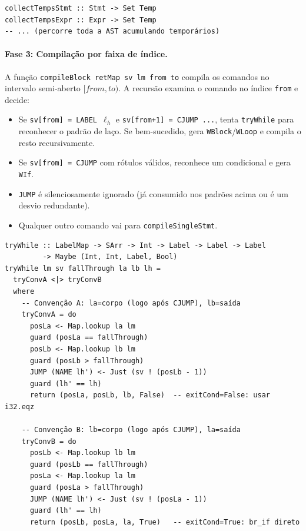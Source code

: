 \begin{verbatim}
collectTempsStmt :: Stmt -> Set Temp
collectTempsExpr :: Expr -> Set Temp
-- ... (percorre toda a AST acumulando temporários)
\end{verbatim}

\paragraph{Fase 3: Compilação por faixa de índice.}
A função \texttt{compileBlock retMap sv lm from to} compila os comandos no
intervalo semi-aberto $[\mathit{from}, \mathit{to})$.  A recursão examina o
comando no índice \texttt{from} e decide:

\begin{itemize}
  \item Se \texttt{sv[from] = LABEL $\ell_h$} e \texttt{sv[from+1] = CJUMP
    ...}, tenta \texttt{tryWhile} para reconhecer o padrão de laço.  Se
    bem-sucedido, gera \texttt{WBlock}/\texttt{WLoop} e compila o resto
    recursivamente.
  \item Se \texttt{sv[from] = CJUMP} com rótulos válidos, reconhece um
    condicional e gera \texttt{WIf}.
  \item \texttt{JUMP} é silenciosamente ignorado (já consumido nos padrões
    acima ou é um desvio redundante).
  \item Qualquer outro comando vai para \texttt{compileSingleStmt}.
\end{itemize}

\begin{verbatim}
tryWhile :: LabelMap -> SArr -> Int -> Label -> Label -> Label
         -> Maybe (Int, Int, Label, Bool)
tryWhile lm sv fallThrough la lb lh =
  tryConvA <|> tryConvB
  where
    -- Convenção A: la=corpo (logo após CJUMP), lb=saída
    tryConvA = do
      posLa <- Map.lookup la lm
      guard (posLa == fallThrough)
      posLb <- Map.lookup lb lm
      guard (posLb > fallThrough)
      JUMP (NAME lh') <- Just (sv ! (posLb - 1))
      guard (lh' == lh)
      return (posLa, posLb, lb, False)  -- exitCond=False: usar i32.eqz

    -- Convenção B: lb=corpo (logo após CJUMP), la=saída
    tryConvB = do
      posLb <- Map.lookup lb lm
      guard (posLb == fallThrough)
      posLa <- Map.lookup la lm
      guard (posLa > fallThrough)
      JUMP (NAME lh') <- Just (sv ! (posLa - 1))
      guard (lh' == lh)
      return (posLb, posLa, la, True)   -- exitCond=True: br_if direto
\end{verbatim}

